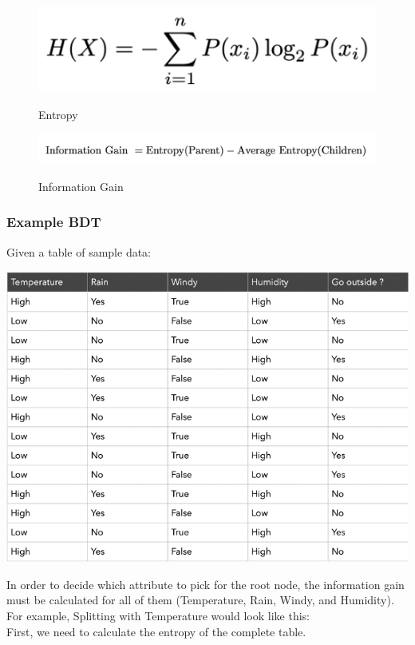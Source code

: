 \documentclass[
12pt,
headsepline,
bibliography=totoc,
twoside=semi,
fleqn
]{scrartcl}
\begin{document}
 \begin{figure}[h]
 \center\includegraphics[scale=0.55]{BDT3.png}\label{fig:fig3}\caption{Entropy}
 \center\includegraphics[scale=0.55]{BDT4.png}\label{fig:fig4}\caption{Information Gain}
 \end{figure}

 \subsubsection{Example BDT\label{sec:sec2-1-3}}
 Given a table of sample data: \\
 
 \begin{center}\includegraphics[scale=0.7]{BDT5.png}\label{fig:fig5}\end{center}
 
 In order to decide which attribute to pick for the root node, the information gain must be calculated for all of them (Temperature, Rain, Windy, and Humidity). For example, Splitting with Temperature would look like this: \\

 First, we need to calculate the entropy of the complete table. 
\end{document}
